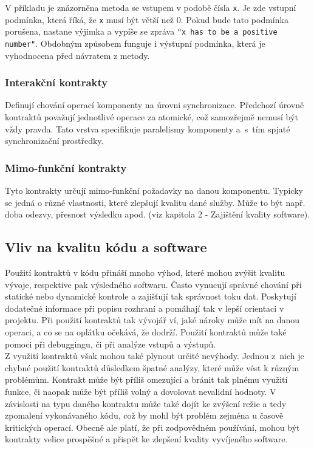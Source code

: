 			V příkladu je znázorněna metoda se vstupem v podobě čísla \texttt{x}. Je zde vstupní podmínka, která říká, že \texttt{x} musí být větší než 0. Pokud bude tato podmínka porušena, nastane výjimka a vypíše se zpráva \texttt{"x has to be a positive number"}. Obdobným způsobem funguje i výstupní podmínka, která je vyhodnocena před návratem z metody.
		
		\subsubsection{Interakční kontrakty}
			Definují chování operací komponenty na úrovni synchronizace. Předchozí úrovně kontraktů považují jednotlivé operace za atomické, což samozřejmě nemusí být vždy pravda. Tato vrstva specifikuje paralelismy komponenty a~s~tím spjaté synchronizační prostředky.
		
		\subsubsection{Mimo-funkční kontrakty}
			Tyto kontrakty určují mimo-funkční požadavky na danou komponentu. Typicky se jedná o různé vlastnosti, které zlepšují kvalitu dané služby. Může to být např. doba odezvy, přesnost výsledku apod. (viz kapitola 2 - Zajištění kvality software).
		
	\subsection{Vliv na kvalitu kódu a software}
		Použití kontraktů v kódu přináší mnoho výhod, které mohou zvýšit kvalitu vývoje, respektive pak výsledného softwaru. Často vynucují správné chování při statické nebo dynamické kontrole a zajišťují tak správnost toku dat. Poskytují dodatečné informace při popisu rozhraní a pomáhají tak v lepší orientaci v projektu. Při použití kontraktů tak vývojář ví, jaké nároky může mít na danou operaci, a co se na oplátku očekává, že dodrží. Použití kontraktů může také pomoci při debuggingu, či při analýze vstupů a výstupů.\\
		
		Z využití kontraktů však mohou také plynout určité nevýhody. Jednou z~nich je chybné použití kontraktů důsledkem špatné analýzy, které může vést k různým problémům. Kontrakt  může být příliš omezující a bránit tak plnému využití funkce, či naopak může být příliš volný a dovolovat nevalidní hodnoty. V závislosti na typu daného kontraktu může také dojít ke zvýšení režie a tedy zpomalení vykonávaného kódu, což by mohl být problém zejména u časově kritických operací. Obecně ale platí, že při zodpovědném používání, mohou být kontrakty velice prospěšné a přispět ke zlepšení kvality vyvíjeného software.


